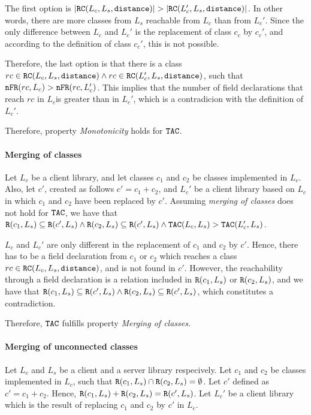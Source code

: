 The first option is $|\verb|RC|(L_c,L_s,\verb|distance|)| > |\verb|RC|(L_c',L_s,\verb|distance|)|$.
In other words, there are more classes from $L_s$ reachable from $L_c$ than from $L_c'$. Since the only difference between $L_c$ and $L_c'$ is the replacement of class $c_c$ by $c_c'$, and according to the definition of class $c_c'$, this is not possible.

Therefore, the last option is that there is a class $rc \in \verb|RC|(L_c,L_s,\verb|distance|) \land rc \in \verb|RC|(L_c',L_s,\verb|distance|)$, such that   $\verb|nFR|(rc,L_c) > \verb|nFR|(rc,L_c')$. This implies that the number of field declarations that reach $rc$ in $L_c$is greater than in $L_c'$, which is a contradicion with the definition of $L_c'$.

Therefore, property \textit{Monotonicity} holds for $\verb|TAC|$.

\paragraph{Merging of classes}
Let $L_c$ be a client library, and let classes $c_1$ and $c_2$ be classes implemented in $L_c$. Also, let $c'$, created as follows $c' = c_1 + c_2$, and $L_c'$ be a client library based on $L_c$ in which $c_1$ and $c_2$ have been replaced by $c'$. Assuming \textit{merging of classes} does not hold for $\verb|TAC|$, we have that $\verb|R|(c_1, L_s) \subseteq \verb|R|(c', L_s) \land \verb|R|(c_2, L_s) \subseteq \verb|R|(c', L_s) \land \verb|TAC|(L_c, L_s) > \verb|TAC|(L_c', L_s)$.

$L_c$ and $L_c'$ are only different in the replacement of $c_1$ and $c_2$ by $c'$. Hence, there has to be a field declaration from $c_1$ or $c_2$ which reaches a class $rc \in \verb|RC|(L_c,L_s,\verb|distance|)$, and is not found in $c'$. However, the reachability through a field declaration is a relation included in $\verb|R|(c_1, L_s)$ or $\verb|R|(c_2, L_s)$, and we have that $\verb|R|(c_1, L_s) \subseteq \verb|R|(c', L_s) \land \verb|R|(c_2, L_s) \subseteq \verb|R|(c', L_s)$, which constitutes a contradiction.

Therefore, $\verb|TAC|$ fulfills property \textit{Merging of classes}.

\paragraph{Merging of unconnected classes}
Let $L_c$ and $L_s$ be a client and a server library respecively. Let $c_1$ and $c_2$ be classes implemented in $L_c$, such that $\verb|R|(c_1, L_s) \cap \verb|R|(c_2, L_s) = \emptyset$. Let $c'$ defined as $c' = c_1 + c_2$. Hence, $\verb|R|(c_1, L_s) + \verb|R|(c_2, L_s) = \verb|R|(c', L_s)$. Let $L_c'$ be a client library which is the result of replacing $c_1$ and $c_2$ by $c'$ in $L_c$.


